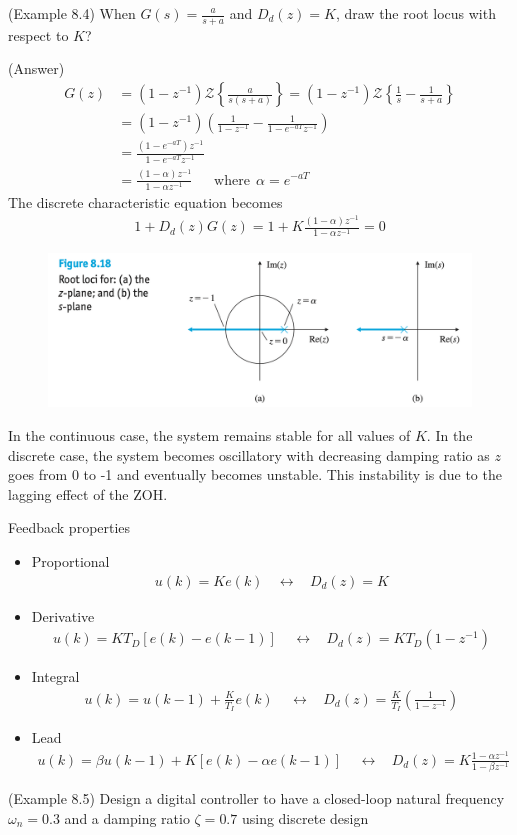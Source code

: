 (Example 8.4)  When $G(s) = \frac{a}{s+a}$ and $D_d(z) = K$, draw the root locus with respect to $K$? 

(Answer) 
\begin{align*}
	G(z) &= (1-z^{-1}) \mathcal{Z} \left\{ \frac{a}{s(s+a)} \right\} = (1-z^{-1}) \mathcal{Z} \left\{ \frac{1}{s}  - \frac{1}{s+a} \right\} \\
	&= (1-z^{-1}) \left( \frac{1}{1-z^{-1}} - \frac{1}{1-e^{-aT}z^{-1}} \right)  \\
	&= \frac{(1-e^{-aT})z^{-1}}{1-e^{-aT}z^{-1}} \\
	&= \frac{(1-\alpha)z^{-1}}{1-\alpha z^{-1}} ~~~~~~~\mbox{where}~~ \alpha = e^{-aT}
\end{align*}
The discrete characteristic equation becomes
\begin{align*}
	1+ D_d(z) G(z) = 1 + K\frac{(1-\alpha)z^{-1}}{1-\alpha z^{-1}}= 0 
\end{align*}

\begin{figure}[h]
	\includegraphics[width=12cm]{./FIG_Franklin/fig8-18.png}
\end{figure}

In the continuous case, the system remains stable for all values of $K$. 
In the discrete case, the system becomes oscillatory with decreasing damping ratio as $z$ goes from 0 to -1 and eventually becomes unstable. This instability is due to the lagging effect of the ZOH. 

%
\newpage
%
Feedback properties 
\begin{itemize}
	\item Proportional 
	\begin{align*}
		u(k) = Ke(k) ~~~~\leftrightarrow~~~~ D_d(z) = K 
	\end{align*}
	\item Derivative 
	\begin{align*}
		u(k) = K T_D [e(k) - e(k-1)] ~~~~~\leftrightarrow~~~~ D_d(z) = KT_D (1-z^{-1})
	\end{align*}
	\item Integral 
	\begin{align*}
		u(k) = u(k-1) + \frac{K}{T_I} e(k) ~~~~~\leftrightarrow~~~~ D_d(z) = \frac{K}{T_I} \left( \frac{1}{1-z^{-1}} \right) 
	\end{align*}
	\item Lead 
	\begin{align*}
		u(k) = \beta u(k-1) + K [e(k) - \alpha e(k-1)] ~~~~~\leftrightarrow~~~~ D_d(z) = K \frac{1- \alpha z^{-1}}{1-\beta z^{-1}} 
	\end{align*}
\end{itemize}
%
%
\newpage
%
%
\newpage
%
(Example 8.5)  Design a digital controller to have a closed-loop natural frequency $\omega_n = 0.3$ and a damping ratio $\zeta = 0.7$ using discrete design

